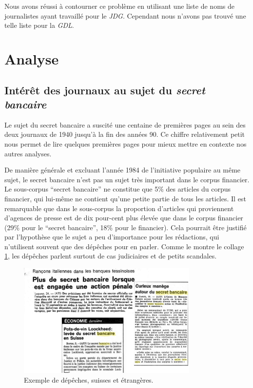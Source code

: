 \documentclass[11pt]{article}
\begin{document}
Nous avons réussi à contourner ce problème en utilisant une liste de
noms de journalistes ayant travaillé pour le \emph{JDG}. Cependant nous
n'avons pas trouvé une telle liste pour la \emph{GDL}.


\hypertarget{analyse}{%
\section{Analyse}\label{analyse}}

\hypertarget{intuxe9ruxeat-des-journaux-au-sujet-du-secret-bancaire}{%
\subsection{\texorpdfstring{Intérêt des journaux au sujet du
\emph{secret
bancaire}}{Intérêt des journaux au sujet du secret bancaire}}\label{intuxe9ruxeat-des-journaux-au-sujet-du-secret-bancaire}}

Le sujet du secret bancaire a suscité une centaine de premières pages au
sein des deux journaux de 1940 jusqu'à la fin des années 90. Ce chiffre
relativement petit nous permet de lire quelques premières pages pour
mieux mettre en contexte nos autres analyses.

De manière générale et excluant l'année 1984 de l'initiative populaire
au même sujet, le secret bancaire n'est pas un sujet très important dans
le corpus financier. Le sous-corpus ``secret bancaire'' ne constitue que
5\% des articles du corpus financier, qui lui-même ne contient qu'une
petite partie de tous les articles. Il est remarquable que dans le
sous-corpus la proportion d'articles qui proviennent d'agences de presse
est de dix pour-cent plus élevée que dans le corpus financier (29\% pour
le ``secret bancaire'', 18\% pour le financier). Cela pourrait être
justifié par l'hypothèse que le sujet a peu d'importance pour les
rédactions, qui n'utilisent souvent que des dépêches pour en parler.
Comme le montre le collage \ref{depeches}, les dépêches parlent surtout
de cas judiciaires et de petits scandales.

\begin{figure}
\centering
\includegraphics[width=0.8\textwidth ]{analysis/agencies_collage.png}
\caption{\label{depeches} Exemple de dépêches, suisses et étrangères.}
\end{figure}
\end{document}
